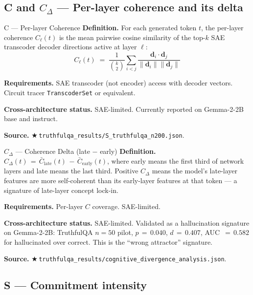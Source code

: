 \documentclass[11pt,letterpaper]{article}
\newcommand{\repro}[1]{%
  \textcolor{fathomgreen}{\footnotesize$\bigstar$\,\texttt{#1}}}
\begin{document}
\subsection{C and $C_\Delta$ --- Per-layer coherence and its delta}

\begin{mcard}{C --- Per-layer Coherence}
\textbf{Definition.} For each generated token $t$, the per-layer coherence
$C_\ell(t)$ is the mean pairwise cosine similarity of the top-$k$ SAE
transcoder decoder directions active at layer $\ell$:
\[
C_\ell(t) \;=\; \frac{1}{\binom{k}{2}} \sum_{i<j}
\frac{\mathbf{d}_i\cdot\mathbf{d}_j}{\|\mathbf{d}_i\|\|\mathbf{d}_j\|}
\]
\vspace{-8pt}

\textbf{Requirements.} SAE transcoder (not encoder) access with decoder
vectors. Circuit tracer \texttt{TranscoderSet} or equivalent.
\vspace{2pt}

\textbf{Cross-architecture status.} SAE-limited. Currently reported on
Gemma-2-2B base and instruct.
\vspace{2pt}

\textbf{Source.} \repro{truthfulqa\_results/S\_truthfulqa\_n200.json}.
\end{mcard}

\begin{mcard}{$C_\Delta$ --- Coherence Delta (late $-$ early)}
\textbf{Definition.} $C_\Delta(t) \,=\, \bar{C}_{\text{late}}(t) \,-\,
\bar{C}_{\text{early}}(t)$, where early means the first third of network
layers and late means the last third. Positive $C_\Delta$ means the model's
late-layer features are more self-coherent than its early-layer features
at that token --- a signature of late-layer concept lock-in.
\vspace{2pt}

\textbf{Requirements.} Per-layer $C$ coverage. SAE-limited.
\vspace{2pt}

\textbf{Cross-architecture status.} SAE-limited. Validated as a
hallucination signature on Gemma-2-2B: TruthfulQA $n\!=\!50$ pilot,
$p\,=\,0.040$, $d\,=\,0.407$, AUC $\,=\,0.582$ for hallucinated over
correct. This is the ``wrong attractor'' signature.
\vspace{2pt}

\textbf{Source.}
\repro{truthfulqa\_results/cognitive\_divergence\_analysis.json}.
\end{mcard}

\subsection{S --- Commitment intensity}
\end{document}
